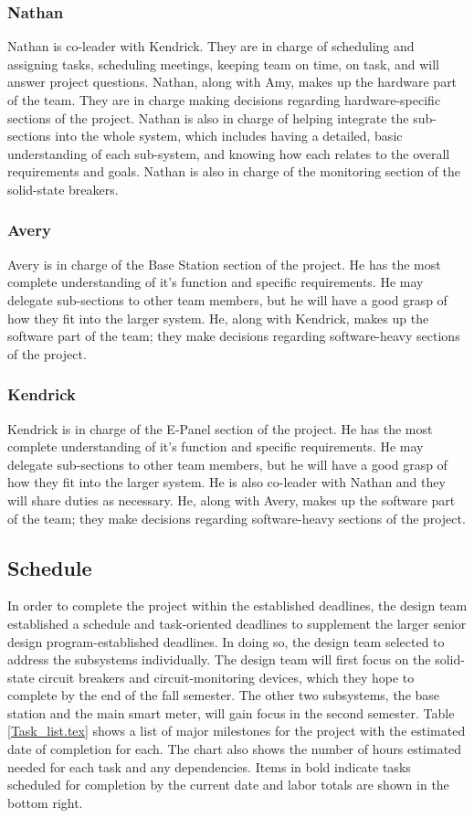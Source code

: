 \subsubsection{Nathan}
Nathan is co-leader with Kendrick. They are in charge of scheduling and assigning tasks, scheduling meetings, keeping team on time, on task, and will answer project questions. Nathan, along with Amy, makes up the hardware part of the team. They are in charge making decisions regarding hardware-specific sections of the project. Nathan is also in charge of helping integrate the sub-sections into the whole system, which includes having a detailed, basic understanding of each sub-system, and knowing how each relates to the overall requirements and goals. Nathan is also in charge of the monitoring section of the solid-state breakers.

\subsubsection{Avery}
Avery is in charge of the Base Station section of the project. He has the most complete understanding of it's function and specific requirements. He may delegate sub-sections to other team members, but he will have a good grasp of how they fit into the larger system. He, along with Kendrick, makes up the software part of the team; they make decisions regarding software-heavy sections of the project.

\subsubsection{Kendrick}
Kendrick is in charge of the E-Panel section of the project. He has the most complete understanding of it's function and specific requirements. He may delegate sub-sections to other team members, but he will have a good grasp of how they fit into the larger system. He is also co-leader with Nathan and they will share duties as necessary. He, along with Avery, makes up the software part of the team; they make decisions regarding software-heavy sections of the project.

\subsection{Schedule}
In order to complete the project within the established deadlines, the design team established a schedule and task-oriented deadlines to supplement the larger senior design program-established deadlines. In doing so, the design team selected to address the subsystems individually. The design team will first focus on the solid-state circuit breakers and circuit-monitoring devices, which they hope to complete by the end of the fall semester. The other two subsystems, the base station and the main smart meter, will gain focus in the second semester. Table \ref{Task_list.tex} shows a list of major milestones for the project with the estimated date of completion for each. The chart also shows the number of hours estimated needed for each task and any dependencies. Items in bold indicate tasks scheduled for completion by the current date and labor totals are shown in the bottom right. 

